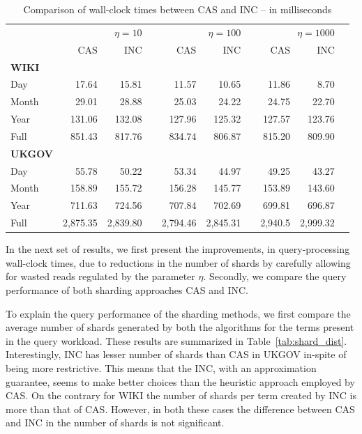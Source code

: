 \begin{table}\centering
\begin{tabular}{@{}lrrrrrrrrr@{}}\toprule
& \multicolumn{2}{r}{\textbf{$\eta=10$}} & \phantom{ab} & \multicolumn{2}{r}{\textbf{$\eta=100$}}& \phantom{ab} & \multicolumn{2}{r}{\textbf{$\eta=1000$}}\\ 
\cmidrule{2-3} \cmidrule{5-6} \cmidrule{8-9}
 & CAS & INC && CAS & INC && CAS & INC\\ \midrule
\textbf{WIKI}\\
 Day & 17.64 & 15.81 && 11.57 & 10.65 && 11.86 & 8.70\\
 Month & 29.01 & 28.88 && 25.03 & 24.22 && 24.75 & 22.70\\
 Year & 131.06 & 132.08 && 127.96 & 125.32 && 127.57 & 123.76\\ 
 Full & 851.43 & 817.76 && 834.74 & 806.87 && 815.20 & 809.90\\
\midrule
\textbf{UKGOV}\\
 Day  & 55.78 & 50.22 && 53.34 & 44.97 && 49.25 & 43.27\\
 Month & 158.89 & 155.72 && 156.28 & 145.77 && 153.89 & 143.60\\
 Year  & 711.63 & 724.56 && 707.84 & 702.69 && 699.81 & 696.87 \\ 
 Full  & 2,875.35 & 2,839.80 && 2,794.46 & 2,845.31 && 2,940.5 & 2,999.32 \\
 \bottomrule
\end{tabular}
\caption{Comparison of wall-clock times between CAS and INC -- in milliseconds}

\label{tab:sharding_qp}
\end{table}

In the next set of results, we first present the improvements, in query-processing wall-clock times, due to reductions in the number of shards by carefully allowing for wasted reads regulated by the parameter $\eta$. Secondly, we compare the query performance of both sharding approaches CAS and INC. 

To explain the query performance of the sharding methods, we first compare the average number of shards generated by both the algorithms for the terms present in the query workload. These results are summarized in Table~\ref{tab:shard_dist}. Interestingly, INC has lesser number of shards than CAS in UKGOV in-spite of being more restrictive. This means that the INC, with an approximation guarantee, seems to make better choices than the heuristic approach employed by CAS. On the contrary for WIKI the number of shards per term created by INC is more than that of CAS. However, in both these cases the difference between CAS and INC in the number of shards is not significant.


